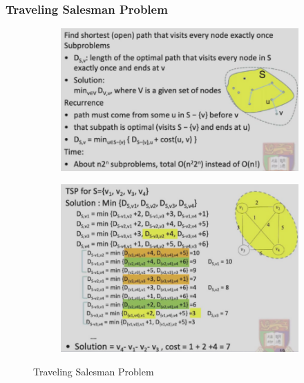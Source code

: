 \subsubsection{Traveling Salesman Problem}
\begin{figure}[H]
    \centering
    \begin{subfigure}{0.309\textwidth}
        \centering
        \includegraphics[width=\textwidth]{pic/DAA8/Traveling Salesman Problem}
    \end{subfigure}
    \begin{subfigure}{0.309\textwidth}
        \centering
        \includegraphics[width=\textwidth]{pic/DAA8/Traveling Salesman Problem1}
    \end{subfigure}
    \caption{Traveling Salesman Problem}
\end{figure}

